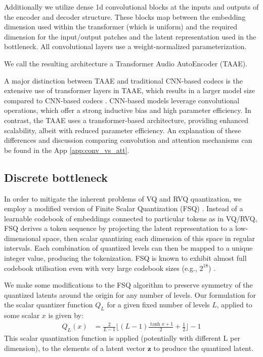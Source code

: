 \documentclass{article} %
\begin{document}
Additionally we utilize dense 1d convolutional blocks at the inputs and outputs of the encoder and decoder structure. These blocks map between the embedding dimension used within the transformer (which is uniform) and the required dimension for the input/output patches and the latent representation used in the bottleneck. All convolutional layers use a weight-normalized parameterization.

We call the resulting architecture a Transformer Audio AutoEncoder (TAAE).

A major distinction between TAAE and traditional CNN-based codecs is the extensive use of transformer layers in TAAE, which results in a larger model size compared to CNN-based codecs \cite{zeghidour2021soundstream, défossez2022high, kumar2023highfidelity}. CNN-based models leverage convolutional operations, which offer a strong inductive bias and high parameter efficiency. In contrast, the TAAE uses a transformer-based architecture, providing enhanced scalability, albeit with reduced parameter efficiency. An explanation of these differences and discussion comparing convolution and attention mechanisms can be found in the App \ref{app:conv_vs_att}.

\subsection{Discrete bottleneck}

In order to mitigate the inherent problems of VQ and RVQ quantization, we employ a modified version of Finite Scalar Quantization (FSQ) \citep{FSQ}. Instead of a learnable codebook of embeddings connected to particular tokens as in VQ/RVQ, FSQ derives a token sequence by projecting the latent representation to a low-dimensional space, then scalar quantizing each dimension of this space in regular intervals. Each combination of quantized levels can then be mapped to a unique integer value, producing the tokenization. FSQ is known to exhibit almost full codebook utilisation even with very large codebook sizes (e.g., $2^{18}$) \citep{FSQ}.

We make some modifications to the FSQ algorithm to preserve symmetry of the quantized latents around the origin for any number of levels. Our formulation for the scalar quantizer function $Q_L$ for a given fixed number of levels $L$, applied to some scalar $x$ is given by:
\begin{align}
Q_L(x) &= \frac{2}{L-1} \lfloor (L-1)\frac{\tanh{x}+1}{2} + \frac{1}{2} \rfloor - 1
\end{align}
This scalar quantization function is applied (potentially with different L per dimension), to the elements of a latent vector $\mathbf{z}$ to produce the quantized latent.
\end{document}
